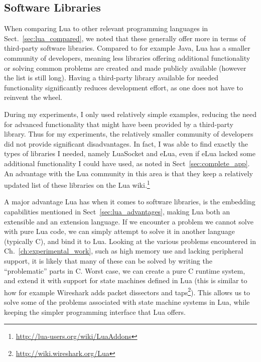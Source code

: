 \subsection{Software Libraries}
\label{sec:disq_libraries}
When comparing Lua to other relevant programming languages in Sect.~\ref{sec:lua_compared}, we noted that these generally offer more in terms of third-party software libraries. Compared to for example Java, Lua has a smaller community of developers, meaning less libraries offering additional functionality or solving common problems are created and made publicly available (however the list is still long). Having a third-party library available for needed functionality significantly reduces development effort, as one does not have to reinvent the wheel.

During my experiments, I only used relatively simple examples, reducing the need for advanced functionality that might have been provided by a third-party library. Thus for my experiments, the relatively smaller community of developers did not provide significant disadvantages. In fact, I was able to find exactly the types of libraries I needed, namely LuaSocket and eLua, even if eLua lacked some additional functionality I could have used, as noted in Sect~\ref{sec:complete_app}. An advantage with the Lua community in this area is that they keep a relatively updated list of these libraries on the Lua wiki.\footnote{\url{http://lua-users.org/wiki/LuaAddons}}

A major advantage Lua has when it comes to software libraries, is the embedding capabilities mentioned in Sect~\ref{sec:lua_advantages}, making Lua both an extensible and an extension language. If we encounter a problem we cannot solve with pure Lua code, we can simply attempt to solve it in another language (typically C), and bind it to Lua. Looking at the various problems encountered in Ch.~\ref{ch:experimental_work}, such as high memory use and lacking peripheral support, it is likely that many of these can be solved by writing the ``problematic'' parts in C. Worst case, we can create a pure C runtime system, and extend it with support for state machines defined in Lua (this is similar to how for example Wireshark adds packet dissectors and taps\footnote{\url{http://wiki.wireshark.org/Lua}}). This allows us to solve some of the problems associated with state machine systems in Lua, while keeping the simpler programming interface that Lua offers.

